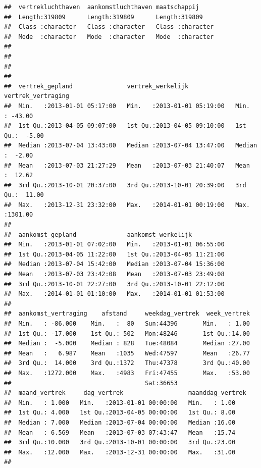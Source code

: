 \documentclass[]{tufte-book}
\begin{document}
\begin{verbatim}
##  vertrekluchthaven  aankomstluchthaven maatschappij      
##  Length:319809      Length:319809      Length:319809     
##  Class :character   Class :character   Class :character  
##  Mode  :character   Mode  :character   Mode  :character  
##                                                          
##                                                          
##                                                          
##                                                          
##  vertrek_gepland               vertrek_werkelijk             vertrek_vertraging
##  Min.   :2013-01-01 05:17:00   Min.   :2013-01-01 05:19:00   Min.   : -43.00   
##  1st Qu.:2013-04-05 09:07:00   1st Qu.:2013-04-05 09:10:00   1st Qu.:  -5.00   
##  Median :2013-07-04 13:43:00   Median :2013-07-04 13:47:00   Median :  -2.00   
##  Mean   :2013-07-03 21:27:29   Mean   :2013-07-03 21:40:07   Mean   :  12.62   
##  3rd Qu.:2013-10-01 20:37:00   3rd Qu.:2013-10-01 20:39:00   3rd Qu.:  11.00   
##  Max.   :2013-12-31 23:32:00   Max.   :2014-01-01 00:19:00   Max.   :1301.00   
##                                                                                
##  aankomst_gepland              aankomst_werkelijk           
##  Min.   :2013-01-01 07:02:00   Min.   :2013-01-01 06:55:00  
##  1st Qu.:2013-04-05 11:22:00   1st Qu.:2013-04-05 11:21:00  
##  Median :2013-07-04 15:42:00   Median :2013-07-04 15:36:00  
##  Mean   :2013-07-03 23:42:08   Mean   :2013-07-03 23:49:08  
##  3rd Qu.:2013-10-01 22:27:00   3rd Qu.:2013-10-01 22:12:00  
##  Max.   :2014-01-01 01:10:00   Max.   :2014-01-01 01:53:00  
##                                                             
##  aankomst_vertraging    afstand     weekdag_vertrek  week_vertrek  
##  Min.   : -86.000    Min.   :  80   Sun:44396       Min.   : 1.00  
##  1st Qu.: -17.000    1st Qu.: 502   Mon:48246       1st Qu.:14.00  
##  Median :  -5.000    Median : 828   Tue:48084       Median :27.00  
##  Mean   :   6.987    Mean   :1035   Wed:47597       Mean   :26.77  
##  3rd Qu.:  14.000    3rd Qu.:1372   Thu:47378       3rd Qu.:40.00  
##  Max.   :1272.000    Max.   :4983   Fri:47455       Max.   :53.00  
##                                     Sat:36653                      
##  maand_vertrek     dag_vertrek                  maanddag_vertrek
##  Min.   : 1.000   Min.   :2013-01-01 00:00:00   Min.   : 1.00   
##  1st Qu.: 4.000   1st Qu.:2013-04-05 00:00:00   1st Qu.: 8.00   
##  Median : 7.000   Median :2013-07-04 00:00:00   Median :16.00   
##  Mean   : 6.569   Mean   :2013-07-03 07:43:47   Mean   :15.74   
##  3rd Qu.:10.000   3rd Qu.:2013-10-01 00:00:00   3rd Qu.:23.00   
##  Max.   :12.000   Max.   :2013-12-31 00:00:00   Max.   :31.00   
## 
\end{verbatim}
\end{document}
